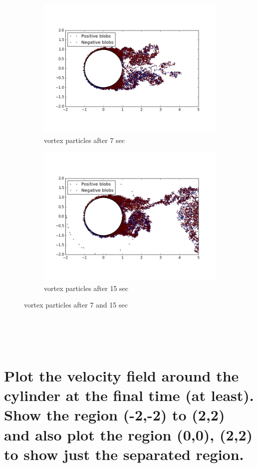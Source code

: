 \documentclass[a4paper,11pt]{article}
\begin{document}
\begin{figure}[ht]
	\centering
	\begin{subfigure}[ht]{.5\textwidth}
  		\centering
  		\includegraphics[width=.8\linewidth]{rb_7.png}
  		\caption{vortex particles after 7 sec}
  		\label{fig:64}
	\end{subfigure}
	\begin{subfigure}[ht]{.5\textwidth}
  		\centering
  		\includegraphics[width=.8\linewidth]{rb_15.png}
  		\caption{vortex particles after 15 sec}
  		\label{fig:80}
	\end{subfigure}
	\label{fig:Question 1a}
  \caption{vortex particles after 7 and 15 sec}
\end{figure}

\newpage
\indent\\
\newpage
\indent\\
\newpage
\indent\\
\section{Plot the velocity field around the cylinder at the final time (at least). Show the region (-2,-2) to (2,2) and also plot the region (0,0), (2,2) to show just the separated region.}
\end{document}
